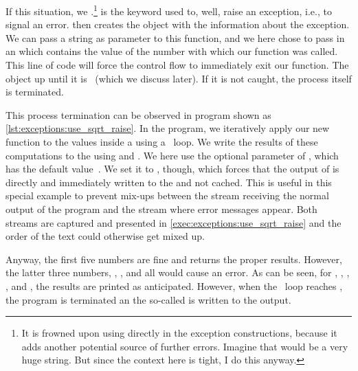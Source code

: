 If this situation, we .\footnote{%
It is frowned upon using  directly in the exception constructions, because it adds another potential source of further errors. %
Imagine that  would be a very huge string. %
But since the context here is tight, I do this anyway.}
 is the keyword used to, well, raise an exception, i.e., to signal an error.
 then creates the object with the information about the exception.
We can pass a string as parameter to this function, and we here chose to pass in an  which contains the value of the number with which our  function was called.
This line of code will force the control flow to immediately exit our  function.
The  object  up until it is ~(which we discuss later).
If it is not caught, the process itself is terminated.

This process termination can be observed in program  shown as \cref{lst:exceptions:use_sqrt_raise}.
In the program, we iteratively apply our new  function to the values inside a  using a ~loop.
We write the results of these computations to the  using  and .
We here use the optional parameter  of , which has the default value~.
We set it to , though, which forces that the output of  is directly and immediately written to the  and not cached.
This is useful in this special example to prevent mix-ups between the  stream receiving the normal output of the program and the  stream where error messages appear.
Both streams are captured and presented in \cref{exec:exceptions:use_sqrt_raise} and the order of the text could otherwise get mixed up.

Anyway, the first five numbers are fine and  returns the proper results.
However, the latter three numbers, , , and  all would cause an error.
As can be seen, for , , , , and , the results are printed as anticipated.
However, when the ~loop reaches , the program is terminated an the so-called  is written to the output.


